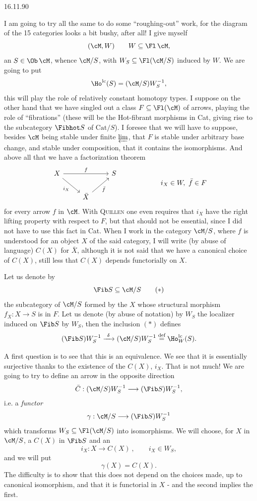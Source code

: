 
\begin{flushright}
16.11.90
\end{flushright}

I am going to try all the same to do some ``roughing-out'' work, for the diagram of the
15 categories looks a bit bushy, %
after all! I give myself
\[
(\cM,W) \qquad W\subseteq \Fl\,\cM,
\]
an $S\in\Ob\,\cM$, whence $\cM/S$, with $W_S\subseteq\Fl(\cM/S)$ induced by $W$. We are going to put
\[
\Ho^{\mathrm{lc}}(S)=(\cM/S)W_S^{-1},
\]
this will play the role of relatively constant homotopy types. I suppose on the other hand
that we have singled out a class $F\subseteq\Fl(\cM)$ of arrows, playing the role of ``fibrations'' (these
will be the Hot-fibrant morphisms in Cat, giving rise to the subcategory $\Fibhot S$
of $\mathrm{Cat}/S$). I foresee that we will have to
suppose, besides $\cM$ being stable under finite $\varprojlim$, that $F$ is stable under arbitrary base change,
and stable under composition, that it contains the isomorphisms. And above all that we
have a factorization theorem
\[
\begin{tikzcd}
X \arrow[rr, "f"] \arrow[dr, "i_X"'] & & S \\
& \bar{X} \arrow[ur, "\bar{f}"'] &
\end{tikzcd}
\qquad\qquad\qquad
i_X\in W,\ \bar{f}\in F
\]
for %
every arrow $f$ in $\cM$. With \textsc{Quillen} one even requires that $i_X$ have the right lifting
property with respect to $F$, but that should not be essential, since I did not
have to use this fact in Cat. When I work in the category $\cM/S$, where $f$ is
understood for an object $X$ of the said category, I will write (by abuse of language) $C(X)$ for $\bar{X}$,
although it is not said that we have a canonical choice of $C(X)$, still less that $C(X)$
depends functorially on $X$.

Let us denote by
\[
\Fib S\subseteq\cM/S \tag*{$(*)$}
\]
the subcategory of $\cM/S$ formed by the $X$ whose structural morphism $f_X:X\longrightarrow S$ is
in $F$. Let us denote (by abuse of notation) by $W_S$ the localizer induced on $\Fib S$ by $W_S$,
then the inclusion $(*)$ defines
\[
(\Fib S)W_S^{-1}\xrightarrow{\ \delta\ }(\cM/S)W_S^{-1}\overset{\text{def}}{=}\Ho^{\mathrm{lc}}_W(S).
\]

A first question is to see that this is an equivalence. We see that it is essentially
surjective thanks to the existence of the $C(X)$, $i_X$. That is not much! We are going to try to define
an arrow in the opposite direction
\[
\bar{C}:(\cM/S)W_S^{-1}\longrightarrow(\Fib S)W_S^{-1},
\]
i.e. a \textit{functor}
\[
\gamma:\cM/S\longrightarrow(\Fib S)W_S^{-1}
\]
which transforms $W_S\subseteq\Fl(\cM/S)$ into isomorphisms. We will choose, for $X$ in $\cM/S$, a
$C(X)$ in $\Fib S$ and an
\[
i_X:X\longrightarrow C(X)\ , \qquad i_X\in W_S,
\]
and we will put
\[
\gamma(X)=C(X).
\]
The difficulty is to show that this does not depend on the choices made, up to canonical
isomorphism, and that it is functorial in $X$ - and the second implies the first.


